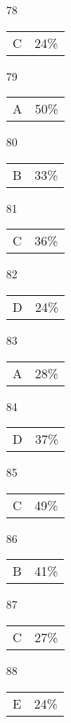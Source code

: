 \documentclass{article}
\begin{document}
\begin{multicols}{4}
\begin{enumerate}
    \item[78] \begin{tabular}{cc} C & 24\%\end{tabular}
    
    \item[79] \begin{tabular}{cc} A & 50\%\end{tabular}
    
    \item[80] \begin{tabular}{cc} B & 33\%\end{tabular}
    
       \item[]
    
    \item[81] \begin{tabular}{cc} C & 36\%\end{tabular}
    
    \item[82] \begin{tabular}{cc} D & 24\%\end{tabular}
    
    \item[83] \begin{tabular}{cc} A & 28\%\end{tabular}
    
    \item[84] \begin{tabular}{cc} D & 37\%\end{tabular}
    
    \item[85] \begin{tabular}{cc} C & 49\%\end{tabular}
    
       \item[]
    
    \item[86] \begin{tabular}{cc} B & 41\%\end{tabular}
    
    \item[87] \begin{tabular}{cc} C & 27\%\end{tabular}
    
    \item[88] \begin{tabular}{cc} E & 24\%\end{tabular}
    

\end{enumerate}
\end{multicols}
\end{document}

